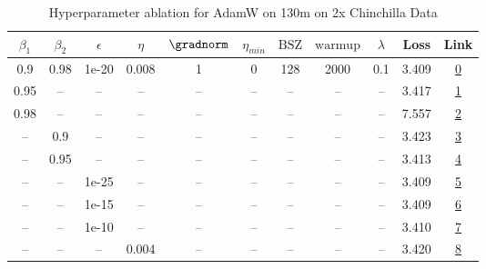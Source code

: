 \begin{table}[H]
\centering
\caption{Hyperparameter ablation for AdamW on 130m on 2x Chinchilla Data}
\label{tab:ablation_adamw_130m_on_2x_chinchilla_data}
\begin{tabular}{ccccccccccc}
\toprule
$\beta_1$ & $\beta_2$ & $\epsilon$ & $\eta$ & $\gradnorm$ & $\eta_{min}$ & $\mathrm{BSZ}$ & $\mathrm{warmup}$ & $\lambda$ & Loss & Link \\
\midrule
0.9 & 0.98 & 1e-20 & 0.008 & 1 & 0 & 128 & 2000 & 0.1 & 3.409 & \href{https://wandb.ai/stanford-mercury/optimizer-scaling/runs/sweep-130m-5B-adamw90f5c1lr0.008-wd0.1-minlr0-warmup2000-b10.9-b-67adb6}{0} \\
\midrule
0.95 & -- & -- & -- & -- & -- & -- & -- & -- & 3.417 & \href{https://wandb.ai/stanford-mercury/optimizer-scaling/runs/sweep-130m-5B-adamw995582lr0.008-wd0.1-minlr0-warmup2000-b10.95--0fb321}{1} \\
0.98 & -- & -- & -- & -- & -- & -- & -- & -- & 7.557 & \href{https://wandb.ai/stanford-mercury/optimizer-scaling/runs/sweep-130m-5B-adamw220e11lr0.008-wd0.1-minlr0-warmup2000-b10.98--f8f851}{2} \\
-- & 0.9 & -- & -- & -- & -- & -- & -- & -- & 3.423 & \href{https://wandb.ai/stanford-mercury/optimizer-scaling/runs/sweep-130m-5B-adamw757bfblr0.008-wd0.1-minlr0-warmup2000-b10.9-b-da391a}{3} \\
-- & 0.95 & -- & -- & -- & -- & -- & -- & -- & 3.413 & \href{https://wandb.ai/stanford-mercury/optimizer-scaling/runs/sweep-130m-5B-adamwc562dclr0.008-wd0.1-minlr0-warmup2000-b10.9-b-9752b5}{4} \\
-- & -- & 1e-25 & -- & -- & -- & -- & -- & -- & 3.409 & \href{https://wandb.ai/stanford-mercury/optimizer-scaling/runs/sweep-130m-5B-adamw0da527lr0.008-wd0.1-minlr0-warmup2000-b10.9-b-9c6463}{5} \\
-- & -- & 1e-15 & -- & -- & -- & -- & -- & -- & 3.409 & \href{https://wandb.ai/stanford-mercury/optimizer-scaling/runs/sweep-130m-5B-adamw4f03a8lr0.008-wd0.1-minlr0-warmup2000-b10.9-b-c453b4}{6} \\
-- & -- & 1e-10 & -- & -- & -- & -- & -- & -- & 3.410 & \href{https://wandb.ai/stanford-mercury/optimizer-scaling/runs/sweep-130m-5B-adamwf4cc20lr0.008-wd0.1-minlr0-warmup2000-b10.9-b-c52587}{7} \\
-- & -- & -- & 0.004 & -- & -- & -- & -- & -- & 3.420 & \href{https://wandb.ai/stanford-mercury/optimizer-scaling/runs/sweep-130m-5B-adamw8cf61clr0.004-wd0.1-minlr0-warmup2000-b10.9-b-481a17}{8} \\

\end{tabular}
\end{table}
